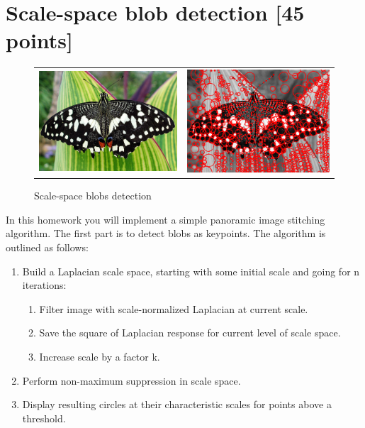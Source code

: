 \documentclass[10pt,letterpaper]{article}
\begin{document}
\newpage

\section{Scale-space blob detection [45 points]}


\begin{figure}[h]
\centering
\begin{tabular}{cc}
\includegraphics[width=0.4\linewidth]{./fig/butterfly.jpg} &
\includegraphics[width=0.4\linewidth]{./fig/butterfly.png} \\
\end{tabular}
\caption{\label{fig:blobs} Scale-space blobs detection}
\end{figure}


In this homework you will implement a simple panoramic image stitching algorithm. The first part is to detect blobs as keypoints. The algorithm is outlined as follows:

\begin{enumerate}
\item Build a Laplacian scale space, starting with some initial scale and going for n iterations:
\begin{enumerate}
\item Filter image with scale-normalized Laplacian at current scale.
\item Save the square of Laplacian response for current level of scale space.
\item Increase scale by a factor k.
\end{enumerate}
\item Perform non-maximum suppression in scale space.
\item Display resulting circles at their characteristic scales for points above a threshold.
\end{enumerate}
\end{document}
